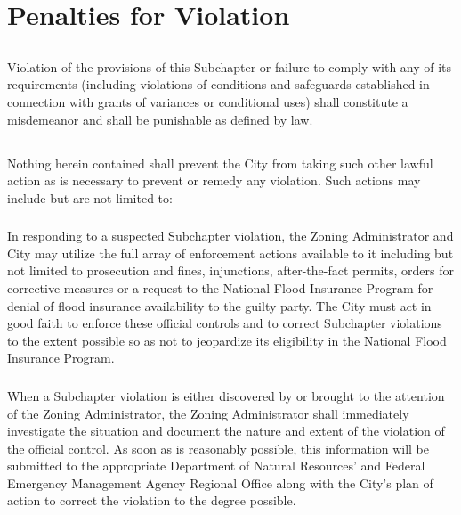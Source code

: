 \section{Penalties for Violation}
\subsection{}
Violation of the provisions of this Subchapter or failure to comply with any of its requirements (including violations of conditions and safeguards established in connection with grants of variances or conditional uses) shall constitute a misdemeanor and shall be punishable as defined by law.
\subsection{}
Nothing herein contained shall prevent the City from taking such other lawful action as is necessary to prevent or remedy any violation. Such actions may include but are not limited to:
\subsubsection{}
In responding to a suspected Subchapter violation, the Zoning Administrator and City may utilize the full array of enforcement actions available to it including but not limited to prosecution and fines, injunctions, after-the-fact permits, orders for corrective measures or a request to the National Flood Insurance Program for denial of flood insurance availability to the guilty party. The City must act in good faith to enforce these official controls and to correct Subchapter violations to the extent possible so as not to jeopardize its eligibility in the National Flood Insurance Program.
\subsubsection{}
When a Subchapter violation is either discovered by or brought to the attention of the Zoning Administrator, the Zoning Administrator shall immediately investigate the situation and document the nature and extent of the violation of the official control. As soon as is reasonably possible, this information will be submitted to the appropriate Department of Natural Resources' and Federal Emergency Management Agency Regional Office along with the City’s plan of action to correct the violation to the degree possible.
